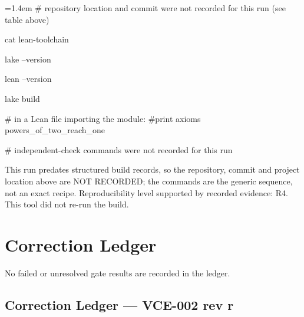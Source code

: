 \documentclass[11pt]{article}
\begin{document}
{\footnotesize\ttfamily\raggedright\hangindent=1.4em\noindent
\hspace*{0.00em}\# repository location and commit were not recorded for this run (see table above)\par
\hspace*{0.00em}cat lean-toolchain\par
\hspace*{0.00em}lake --version\par
\hspace*{0.00em}lean --version\par
\hspace*{0.00em}lake build\par
\hspace*{0.00em}\# in a Lean file importing the module:  \#print axioms powers\_\allowbreak{}of\_\allowbreak{}two\_\allowbreak{}reach\_\allowbreak{}one\par
\hspace*{0.00em}\# independent-check commands were not recorded for this run\par
}

This run predates structured build records, so the repository, commit and project location above are NOT RECORDED; the commands are the generic sequence, not an exact recipe.
Reproducibility level supported by recorded evidence: R4. This tool did not re-run the build.
\section{Correction Ledger}
No failed or unresolved gate results are recorded in the ledger.
\subsection*{Correction Ledger --- VCE-002 rev r}
\end{document}
